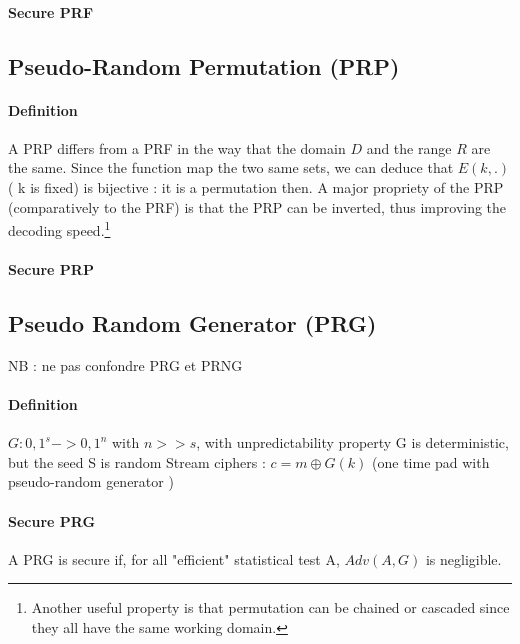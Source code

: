 \paragraph{Secure PRF \\}

\subsection{Pseudo-Random Permutation   (PRP)}


\paragraph{Definition \\}

A PRP differs from a PRF in the way that the domain $D$ and the range $R$ are the same. Since the function map the two same sets, we can deduce that $E(k,.)$ ( k is fixed) is bijective : it is a permutation then.
A major propriety of the PRP (comparatively to the PRF) is that the PRP can be inverted, thus improving the decoding speed.\footnote{Another useful property is that permutation can be chained or cascaded since they all have the same working domain.}

\paragraph{Secure PRP \\}

\subsection{Pseudo Random Generator     (PRG)} 

NB : ne pas confondre PRG et PRNG

\paragraph{Definition \\}

$ G : {0,1}^s -> {0,1}^n $  with  $n>>s$, with unpredictability property
G is deterministic, but the seed S is random
Stream ciphers : $c = m \oplus G(k) $  (one time pad with pseudo-random generator )


\paragraph{Secure PRG \\}
A PRG is secure if, for all "efficient" statistical test A, $Adv(A,G)$ is negligible.

